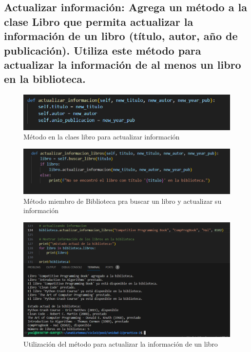 \documentclass[11pt,a4paper]{article}
\begin{document}
\subsection{Actualizar información:
Agrega un método a la clase Libro que permita actualizar la información de un libro (título, autor, año de publicación).
Utiliza este método para actualizar la información de al menos un libro en la biblioteca.}
\begin{figure}[H]
    \centering
    \includegraphics[width=1\linewidth]{images/5.png}
    \caption{Método en la claes libro para actualizar información}
    \label{fig:enter-label}
\end{figure}

\begin{figure}[H]
    \centering
    \includegraphics[width=1\linewidth]{images/5-2.png}
    \caption{Método miembro de Biblioteca pra buscar un libro y actualizar su información}
    \label{fig:enter-label}
\end{figure}

\begin{figure}[H]
    \centering
    \includegraphics[width=1\linewidth]{images/5-3.png}
    \caption{Utilización del método para actualizar la información de un libro}
    \label{fig:enter-label}
\end{figure}
\end{document}
